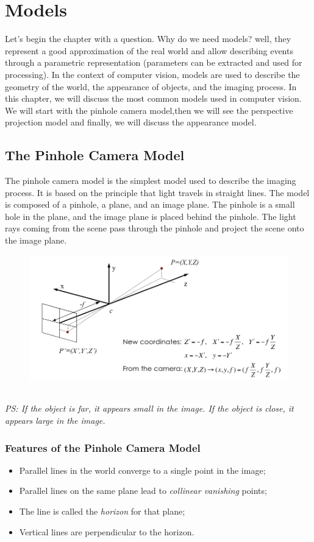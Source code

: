 \chapter{Models}
Let's begin the chapter with a question. Why do we need models?
well, they represent a good approximation of the real world and allow describing events through a parametric representation (parameters can be extracted and used for processing). In the context of computer vision, models are used to describe the geometry of the world, the appearance of objects, and the imaging process. In this chapter, we will discuss the most common models used in computer vision. We will start with the pinhole camera model,then we will see the perspective projection model and finally, we will discuss the appearance model.
\section{The Pinhole Camera Model}
The pinhole camera model is the simplest model used to describe the imaging process. It is based on the principle that light travels in straight lines. The model is composed of a pinhole, a plane, and an image plane. The pinhole is a small hole in the plane, and the image plane is placed behind the pinhole. The light rays coming from the scene pass through the pinhole and project the scene onto the image plane. 
\begin{figure}[h]
    \centering
    \includegraphics[width=1\textwidth]{Figures/Pinhole.png}
\end{figure}
\\\textit{PS: If the object is far, it appears small in the image. If the object is close, it appears large in the image.}
\subsection{Features of the Pinhole Camera Model}
\begin{itemize}
    \item Parallel lines in the world converge to a single point in the image;
    \item Parallel lines on the same plane lead to \textit{collinear vanishing} points;
    \item The line is called the \textit{horizon} for that plane;
    \item Vertical lines are perpendicular to the horizon.
\end{itemize}
